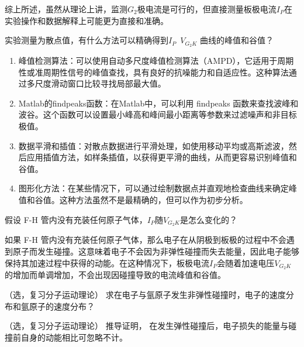 \documentclass[dvipsnames, svgnames,a4paper,11pt]{article}
\begin{document}
	综上所述，虽然从理论上讲，监测$ G_2 $极电流是可行的，但直接测量板极电流$I_P$在实验操作和数据解释上可能更为直接和准确。



\begin{question}
	实验测量为散点值，有什么方法可以精确得到$I_P$~$V_{G_2K}$ 曲线的峰值和谷值？
\end{question}

	\begin{enumerate}
		\item 峰值检测算法：可以使用自动多尺度峰值检测算法（AMPD），它适用于周期性或准周期性信号的峰值查找，具有良好的抗噪能力和自适应性。这种算法通过多尺度滑动窗口比较寻找局部最大值。
		\item Matlab的findpeaks函数：在Matlab中，可以利用 findpeaks 函数来查找波峰和波谷。这个函数可以设置最小峰高和峰间最小距离等参数来过滤噪声和非目标极值。
		\item 数据平滑和插值：对散点数据进行平滑处理，如使用移动平均或高斯滤波，然后应用插值方法，如样条插值，以获得更平滑的曲线，从而更容易识别峰值和谷值。
		\item 图形化方法：在某些情况下，可以通过绘制数据点并直观地检查曲线来确定峰值和谷值。这种方法虽然不是最精确的，但可以作为初步分析。
	\end{enumerate}



\begin{question}
	假设 F-H 管内没有充装任何原子气体，$I_P$随$V_{G_2K}$是怎么变化的？
\end{question}

	如果 F-H 管内没有充装任何原子气体，那么电子在从阴极到板极的过程中不会遇到原子而发生碰撞。这意味着电子不会因为非弹性碰撞而失去能量，因此电子能够保持其加速过程中获得的动能。在这种情况下，板极电流$I_P$会随着加速电压$V_{G_2K}$的增加而单调增加，不会出现因碰撞导致的电流峰值和谷值。



\begin{question}
	（选，复习分子运动理论） 求在电子与氩原子发生非弹性碰撞时，电子的速度分布和氩原子的速度分布？
\end{question}





\begin{question}
	（选，复习分子运动理论） 推导证明， 在发生弹性碰撞后，电子损失的能量与碰撞前自身的动能相比可忽略不计。
\end{question}
\end{document}
